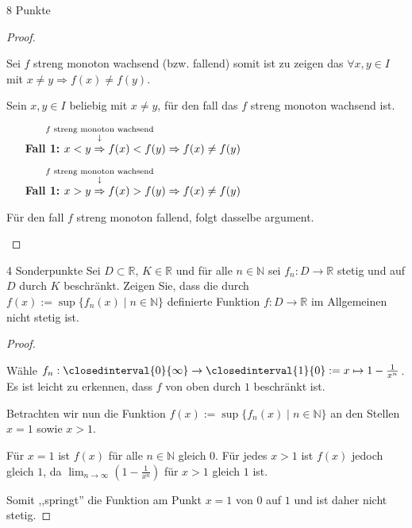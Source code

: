 \documentclass{problemset}
\begin{document}
\begin{problem}{8 Punkte}
\begin{proof}
\begin{itemize}
              Sei $f$ streng monoton wachsend (bzw. fallend) somit ist zu zeigen das $\forall x, y \in I$ mit $x \neq y \Rightarrow f(x) \ne f(y)$.

              Sein $x,y \in I$ beliebig mit $x \ne y$, für den fall das $f$ streng monoton wachsend ist.

              \begin{itemize}
                  \item [\textbf{Fall 1:}] $x < y \annotated{$f$ streng monoton wachsend}{\Rightarrow} f(x) < f(y) \Rightarrow f(x) \ne f(y)$ \checkmark
                  \item [\textbf{Fall 1:}] $x > y \annotated{$f$ streng monoton wachsend}{\Rightarrow} f(x) > f(y) \Rightarrow f(x) \ne f(y)$ \checkmark
              \end{itemize}

              Für den fall $f$ streng monoton fallend, folgt dasselbe argument.
    \end{itemize}
\end{proof}
\end{problem}

\begin{problem}{4 Sonderpunkte}
Sei $D \subset \mathbb{R}$, $K \in \mathbb{R}$ und für alle $n \in \mathbb{N}$ sei $f_n : D \to \mathbb{R}$ stetig und auf $D$ durch $K$ beschränkt. Zeigen Sie, dass die durch $f(x) := \sup\{f_n(x) \mid n \in \mathbb{N}\}$ definierte Funktion $f : D \to \mathbb{R}$ im Allgemeinen nicht stetig ist.
\begin{proof}
    $ $

    Wähle $f_n: \closedinterval{0}{\infty} \rightarrow \closedinterval{1}{0} := x \mapsto 1 - \frac{1}{x^n}$. Es ist leicht zu erkennen, dass $f$ von oben durch $1$ beschränkt ist.

    Betrachten wir nun die Funktion $f(x) := \sup\{f_n(x) \mid n \in \mathbb{N}\}$ an den Stellen $x = 1$ sowie $x > 1$.

    Für $x = 1$ ist $f(x)$ für alle $n \in \mathbb{N}$ gleich $0$. Für jedes $x > 1$ ist $f(x)$ jedoch gleich $1$, da $\lim_{{n \to \infty}} (1 - \frac{1}{x^n})$ für $x > 1$ gleich $1$ ist.

    Somit ,,springt'' die Funktion am Punkt $x = 1$ von $0$ auf $1$ und ist daher nicht stetig.
\end{proof}
\end{problem}
\end{document}
